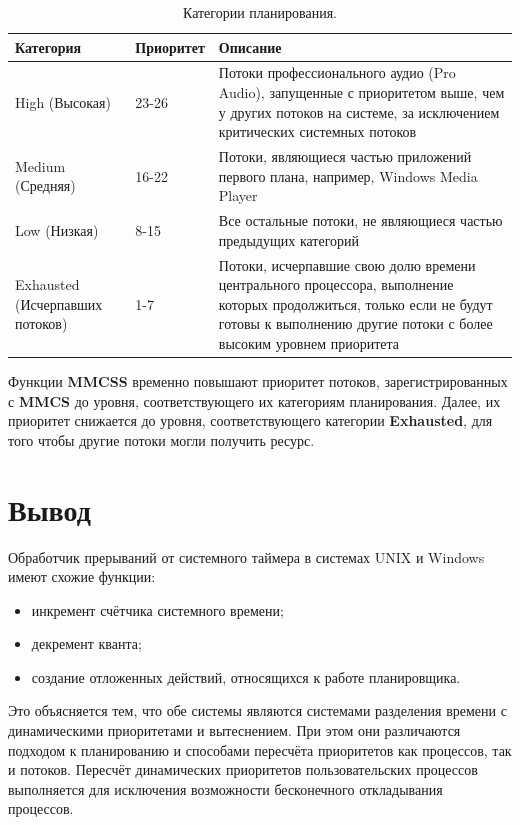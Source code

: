 \documentclass[a4paper,12pt]{extreport}
\begin{document}
\begin{table}[H]
	\caption{Категории планирования.}
	\begin{center}
		\begin{tabular}{|p{40mm}|p{30mm}|p{80mm}|}
			\hline
			\textbf{Категория} & \textbf{Приоритет} & \textbf{Описание} \\
			\hline
			High (Высокая) & 23-26 & Потоки профессионального аудио (Pro Audio), запущенные с приоритетом выше, чем у других потоков на системе, за исключением критических системных потоков \\
			\hline
			Medium (Средняя) & 16-22 & Потоки, являющиеся частью приложений первого плана, например, Windows Media Player \\
			\hline
			Low (Низкая) & 8-15 & Все остальные потоки, не являющиеся частью предыдущих категорий \\
			\hline
			Exhausted (Исчерпавших потоков) & 1-7 & Потоки, исчерпавшие свою долю времени центрального процессора, выполнение которых продолжиться, только если не будут готовы к выполнению другие потоки с более высоким уровнем приоритета \\
			\hline
		\end{tabular}
	\end{center}
	\label{tab:plan}
\end{table}

Функции \textbf{MMCSS} временно повышают приоритет потоков, зарегистрированных с \textbf{MMCS} до уровня, соответствующего их категориям планирования. Далее, их приоритет снижается до уровня, соответствующего категории \textbf{Exhausted}, для того чтобы другие потоки могли получить ресурс.

\chapter{Вывод}

Обработчик прерываний от системного таймера в системах UNIX и Windows имеют схожие функции:

\begin{itemize}
	\item инкремент счётчика системного времени;
	\item декремент кванта;
	\item создание отложенных действий, относящихся к работе планировщика.
\end{itemize}

Это объясняется тем, что обе системы являются системами разделения времени с динамическими приоритетами и вытеснением. При этом они различаются подходом к планированию и способами пересчёта приоритетов как процессов, так и потоков. Пересчёт динамических приоритетов пользовательских процессов выполняется для исключения возможности бесконечного откладывания процессов.
\end{document}
